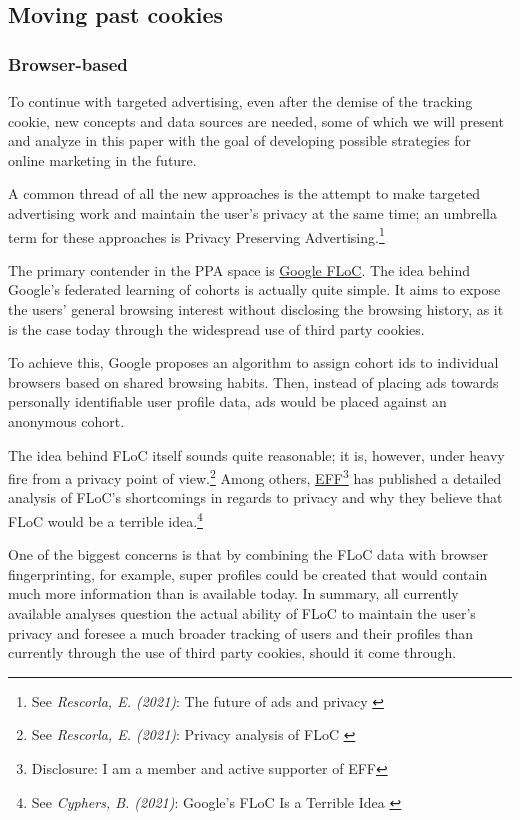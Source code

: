 \subsection{Moving past cookies}

\subsubsection{Browser-based}

To continue with targeted advertising, even after the demise of the tracking cookie, new concepts and data sources are needed, some of which we will present and analyze in this paper with the goal of developing possible strategies for online marketing in the future.

A common thread of all the new approaches is the attempt to make targeted advertising work and maintain the user's privacy at the same time; an umbrella term for these approaches is Privacy Preserving Advertising.\footnote{See \textit{Rescorla, E. (2021)}: The future of ads and privacy \cite{futureAds}}

The primary contender in the PPA space is \href{https://wicg.github.io/floc/}{Google FLoC}. The idea behind Google's federated learning of cohorts is actually quite simple. It aims to expose the users' general browsing interest without disclosing the browsing history, as it is the case today through the widespread use of third party cookies.

To achieve this, Google proposes an algorithm to assign cohort ids to individual browsers based on shared browsing habits. Then, instead of placing ads towards personally identifiable user profile data, ads would be placed against an anonymous cohort. 

The idea behind FLoC itself sounds quite reasonable; it is, however, under heavy fire from a privacy point of view.\footnote{See \textit{Rescorla, E. (2021)}: Privacy analysis of FLoC \cite{privacyFloc}} Among others, \href{https://www.eff.org/}{EFF}\footnote{Disclosure: I am a member and active supporter of EFF} has published a detailed analysis of FLoC's shortcomings in regards to privacy and why they believe that FLoC would be a terrible idea.\footnote{See \textit{Cyphers, B. (2021)}: Google’s FLoC Is a Terrible Idea \cite{terribleIdea}}

One of the biggest concerns is that by combining the FLoC data with browser fingerprinting, for example, super profiles could be created that would contain much more information than is available today. In summary, all currently available analyses question the actual ability of FLoC to maintain the user's privacy and foresee a much broader tracking of users and their profiles than currently through the use of third party cookies, should it come through.

